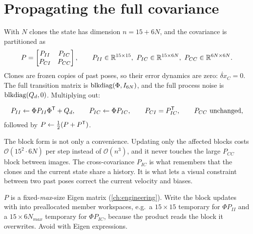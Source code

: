 \section{Propagating the full covariance}

With $N$ clones the state has dimension $n = 15 + 6N$, and the covariance is partitioned as
\begin{equation}
  P = \begin{bmatrix} P_{II} & P_{IC} \\ P_{CI} & P_{CC} \end{bmatrix},
  \qquad P_{II}\in\R^{15\times15},\ P_{IC}\in\R^{15\times6N},\ P_{CC}\in\R^{6N\times6N}.
\end{equation}
Clones are frozen copies of past poses, so their error dynamics are zero: $\dot{\delta x}_C = 0$. The full
transition matrix is $\operatorname{blkdiag}(\Phi, I_{6N})$, and the full process noise is $\operatorname{blkdiag}(Q_d, 0)$. Multiplying out:

\begin{convention}
\begin{equation}
  P_{II} \gets \Phi P_{II}\Phi^{\mathsf{T}} + Q_d, \qquad P_{IC} \gets \Phi P_{IC}, \qquad P_{CI} = P_{IC}^{\mathsf{T}}, \qquad P_{CC}\ \text{unchanged},
\end{equation}
followed by $P \gets \tfrac12(P + P^{\mathsf{T}})$.
\end{convention}

The block form is not only a convenience. Updating only the affected blocks costs $\mathcal{O}(15^2\cdot 6N)$ per step
instead of $\mathcal{O}(n^3)$, and it never touches the large $P_{CC}$ block between images. The cross-covariance
$P_{IC}$ is what remembers that the clones and the current state share a history. It is what lets a visual
constraint between two past poses correct the current velocity and biases.

\begin{implnote}
$P$ is a fixed-\emph{max}-size Eigen matrix (\cref{ch:engineering}). Write the block updates with  into
preallocated member workspaces, e.g.\ a $15\times15$ temporary for $\Phi P_{II}$ and a $15\times6N_{max}$ temporary for
$\Phi P_{IC}$, because the product reads the block it overwrites. Avoid  with Eigen expressions.
\end{implnote}

